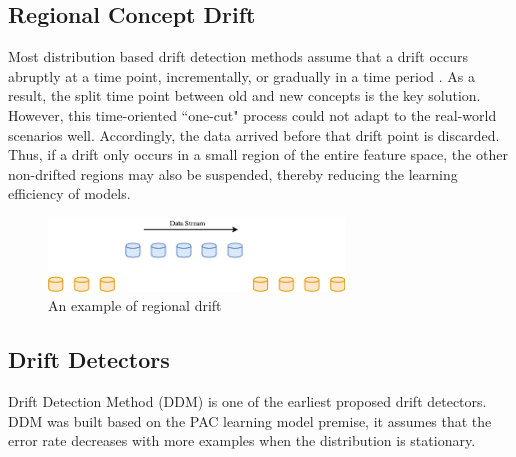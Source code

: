 \subsection{Regional Concept Drift}%
Most distribution based drift detection methods assume that a drift occurs abruptly at a time point, incrementally, or gradually in a time period \cite{gradual}. As a result, the split time point between old and new concepts is the key solution. However, this time-oriented ``one-cut" process could not adapt to the real-world scenarios well. Accordingly, the data arrived before that drift point is discarded. Thus, if a drift only occurs in a small region of the entire feature space, the other non-drifted regions may also be suspended, thereby reducing the learning efficiency of models. %

\begin{figure}[h!]
    \centering
    \includegraphics[width=0.7\textwidth]{RelatedWorks/regional.png}
    \caption{An example of regional drift}
    \label{fig:gradual}
\end{figure}

\subsection{Drift Detectors}


\begin{definition}
\label{ddm}
Drift Detection Method (DDM) is one of the earliest proposed drift detectors. DDM was built based on the PAC learning model premise, it assumes that the error rate decreases with more examples when the distribution is stationary.
\end{definition}


